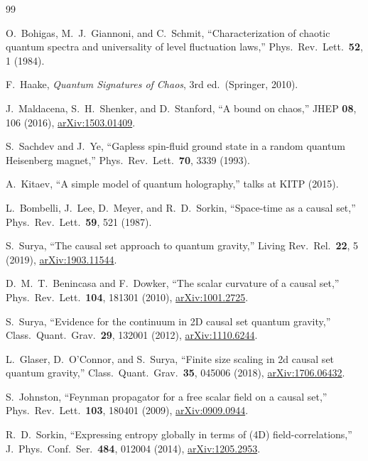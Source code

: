 \documentclass[aps,prd,twocolumn,superscriptaddress,nofootinbib]{revtex4-2}
\begin{document}
\begin{thebibliography}{99}

O.~Bohigas, M.~J.~Giannoni, and C.~Schmit,
``Characterization of chaotic quantum spectra and universality of level fluctuation laws,''
Phys.\ Rev.\ Lett.\ \textbf{52}, 1 (1984).

F.~Haake,
\emph{Quantum Signatures of Chaos}, 3rd ed.\ (Springer, 2010).

J.~Maldacena, S.~H.~Shenker, and D.~Stanford,
``A bound on chaos,''
JHEP \textbf{08}, 106 (2016),
\href{https://arxiv.org/abs/1503.01409}{arXiv:1503.01409}.

S.~Sachdev and J.~Ye,
``Gapless spin-fluid ground state in a random quantum Heisenberg magnet,''
Phys.\ Rev.\ Lett.\ \textbf{70}, 3339 (1993).

A.~Kitaev,
``A simple model of quantum holography,''
talks at KITP (2015).

L.~Bombelli, J.~Lee, D.~Meyer, and R.~D.~Sorkin,
``Space-time as a causal set,''
Phys.\ Rev.\ Lett.\ \textbf{59}, 521 (1987).

S.~Surya,
``The causal set approach to quantum gravity,''
Living Rev.\ Rel.\ \textbf{22}, 5 (2019),
\href{https://arxiv.org/abs/1903.11544}{arXiv:1903.11544}.

D.~M.~T.~Benincasa and F.~Dowker,
``The scalar curvature of a causal set,''
Phys.\ Rev.\ Lett.\ \textbf{104}, 181301 (2010),
\href{https://arxiv.org/abs/1001.2725}{arXiv:1001.2725}.

S.~Surya,
``Evidence for the continuum in 2D causal set quantum gravity,''
Class.\ Quant.\ Grav.\ \textbf{29}, 132001 (2012),
\href{https://arxiv.org/abs/1110.6244}{arXiv:1110.6244}.

L.~Glaser, D.~O'Connor, and S.~Surya,
``Finite size scaling in 2d causal set quantum gravity,''
Class.\ Quant.\ Grav.\ \textbf{35}, 045006 (2018),
\href{https://arxiv.org/abs/1706.06432}{arXiv:1706.06432}.

S.~Johnston,
``Feynman propagator for a free scalar field on a causal set,''
Phys.\ Rev.\ Lett.\ \textbf{103}, 180401 (2009),
\href{https://arxiv.org/abs/0909.0944}{arXiv:0909.0944}.

R.~D.~Sorkin,
``Expressing entropy globally in terms of (4D) field-correlations,''
J.\ Phys.\ Conf.\ Ser.\ \textbf{484}, 012004 (2014),
\href{https://arxiv.org/abs/1205.2953}{arXiv:1205.2953}.


\end{thebibliography}
\end{document}
